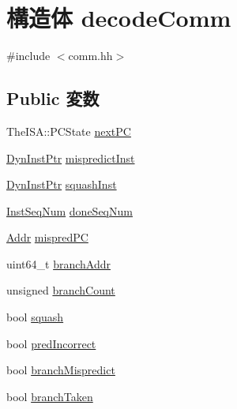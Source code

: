 \hypertarget{structTimeBufStruct_1_1decodeComm}{
\section{構造体 decodeComm}
\label{structTimeBufStruct_1_1decodeComm}
}


{\ttfamily \#include $<$comm.hh$>$}\subsection*{Public 変数}
\begin{DoxyCompactItemize}
\item 
TheISA::PCState \hyperlink{structTimeBufStruct_1_1decodeComm_aef3ad01245ca343e181967f07b45d64f}{nextPC}
\item 
\hyperlink{structTimeBufStruct_a028ce10889c5f6450239d9e9a7347976}{DynInstPtr} \hyperlink{structTimeBufStruct_1_1decodeComm_a30072968ccd286f8f546aa26eb2c5c33}{mispredictInst}
\item 
\hyperlink{structTimeBufStruct_a028ce10889c5f6450239d9e9a7347976}{DynInstPtr} \hyperlink{structTimeBufStruct_1_1decodeComm_afa5fc700e0c019c77c06164b8aa9367d}{squashInst}
\item 
\hyperlink{inst__seq_8hh_a258d93d98edaedee089435c19ea2ea2e}{InstSeqNum} \hyperlink{structTimeBufStruct_1_1decodeComm_a45920c1d79a22b1320274c5f53504654}{doneSeqNum}
\item 
\hyperlink{base_2types_8hh_af1bb03d6a4ee096394a6749f0a169232}{Addr} \hyperlink{structTimeBufStruct_1_1decodeComm_a6b1e9add7cf7068e3e5a818b3620d431}{mispredPC}
\item 
uint64\_\-t \hyperlink{structTimeBufStruct_1_1decodeComm_a7ace6908c22f3540a6e47ba6e4c93ca9}{branchAddr}
\item 
unsigned \hyperlink{structTimeBufStruct_1_1decodeComm_a644677c475ad18d9385f149676b410f0}{branchCount}
\item 
bool \hyperlink{structTimeBufStruct_1_1decodeComm_a61b7f55a2e0399c2eee9f78204b37d8c}{squash}
\item 
bool \hyperlink{structTimeBufStruct_1_1decodeComm_ae212dd334d04ad76e2db0bec9487c24c}{predIncorrect}
\item 
bool \hyperlink{structTimeBufStruct_1_1decodeComm_a6cb772edab329f6d602f28bcc5e135d8}{branchMispredict}
\item 
bool \hyperlink{structTimeBufStruct_1_1decodeComm_abea53a673db4866c41444561cbc6dac0}{branchTaken}
\end{DoxyCompactItemize}

